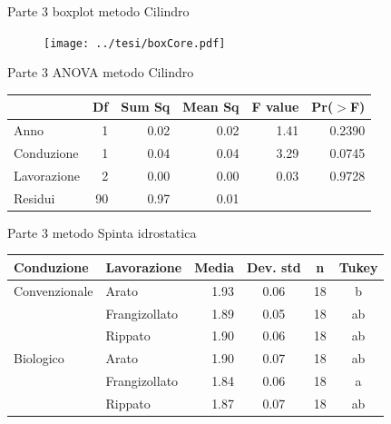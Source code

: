 \documentclass[10pt]{beamer}
\begin{document}
\begin{frame}
\end{frame}


\begin{frame}{Parte 3 \small{boxplot metodo Cilindro}}
  
  \begin{figure}
    \texttt{[image: ../tesi/boxCore.pdf]}
  \end{figure}
\end{frame}

\begin{frame}{Parte 3 \small{ ANOVA metodo  Cilindro} }
  \begin{table}[ht]
    \centering
    \label{tab:anova del modello}
    \begin{tabular}{lrrrrr}
      \hline
      & Df & Sum Sq & Mean Sq & F value & Pr($>$F) \\ 
      \hline 
      Anno         & 1  &  0.02  &  0.02  &   1.41   & 0.2390   \\ 
      Conduzione   & 1  &  0.04  &  0.04  &   3.29   & 0.0745   \\ 
      Lavorazione  & 2  &  0.00  &  0.00  &   0.03   & 0.9728   \\ 
      Residui      & 90 &  0.97  &  0.01  &          &          \\ 
      \hline
    \end{tabular}
  \end{table}
\end{frame}

\begin{frame}[label=Clod]{Parte 3 \small{ metodo Spinta idrostatica}}
  \hyperlink{finale}{}
  \footnotesize
  \begin{table}[ht]
    \centering
    \begin{tabular}{llrccc}
      \hline
      Conduzione    & Lavorazione   & Media& Dev. std & n    & Tukey \\ 
      \hline
      Convenzionale & Arato         & 1.93 & 0.06      &  18 & b     \\ 
                    & Frangizollato & 1.89 & 0.05      &  18 & ab    \\ 
                    & Rippato       & 1.90 & 0.06      &  18 & ab    \\ 
      Biologico     & Arato         & 1.90 & 0.07      &  18 & ab    \\ 
                    & Frangizollato & 1.84 & 0.06      &  18 & a     \\ 
                    & Rippato       & 1.87 & 0.07      &  18 & ab    \\ 
      \hline
    \end{tabular}
    \label{tab:RiassuntoDensitaSpinta}
  \end{table}
\end{frame}
\end{document}
